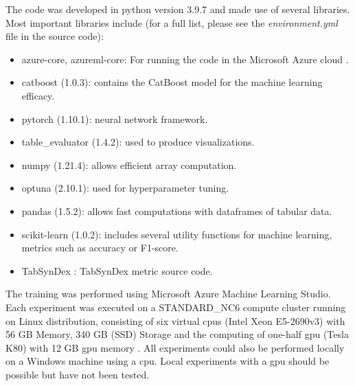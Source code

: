 The code was developed in python version 3.9.7 and made use of several libraries.
Most important libraries include (for a full list, please see the \textit{environment.yml} file in the source code):
\begin{itemize}
	\item azure-core, azureml-core: For running the code in the Microsoft Azure cloud \cite{microsoft2023CloudComputingServices}.
	\item catboost (1.0.3): contains the CatBoost model for the machine learning efficacy.
	\item pytorch (1.10.1): neural network framework.
	\item table\_evaluator (1.4.2): used to produce visualizations.
	\item numpy (1.21.4): allows efficient array computation.
	\item optuna (2.10.1): used for hyperparameter tuning.
	\item pandas (1.5.2): allows fast computations with dataframes of tabular data.
	\item scikit-learn (1.0.2): includes several utility functions for machine learning, \eg metrics such as accuracy or F1-score.
	\item TabSynDex \cite{chundawat2022UniversalMetricRobusta}: TabSynDex metric source code.
\end{itemize}

The training was performed using Microsoft Azure Machine Learning Studio.
Each experiment was executed on a STANDARD\_NC6 compute cluster running on Linux distribution, consisting of six virtual \glspl{cpu} (Intel Xeon E5-2690v3) with 56 GB Memory, 340 GB (SSD) Storage and the computing of one-half \gls{gpu} (Tesla K80) with 12 GB \gls{gpu} memory \cite{vikancha-msft2022NCseriesAzureVirtual}.
All experiments could also be performed locally on a Windows machine using a \gls{cpu}.
Local experiments with a \gls{gpu} should be possible but have not been tested.

